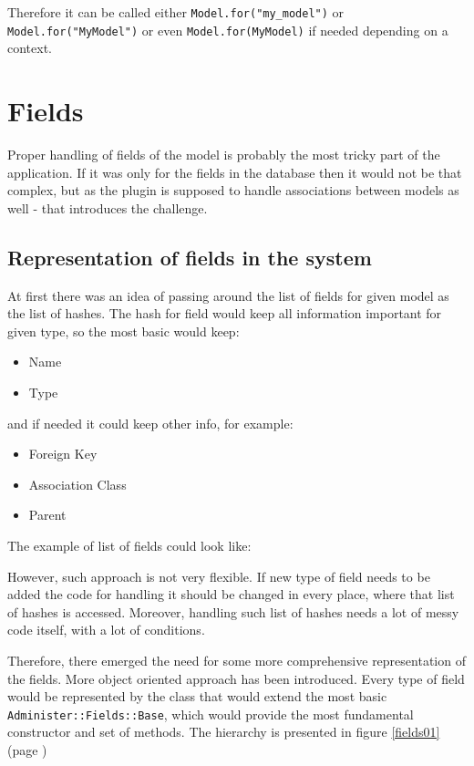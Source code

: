       Therefore it can be called either \texttt{Model.for("my\_model")} or \texttt{Model.for("MyModel")} or even \texttt{Model.for(MyModel)} if needed depending on a context.
      
  \section{Fields}
    Proper handling of fields of the model is probably the most tricky part of the application. If it was only
    for the fields in the database then it would not be that complex, but as the plugin is supposed to handle associations
    between models as well - that introduces the challenge.
    
    \subsection{Representation of fields in the system}
      At first there was an idea of passing around the list of fields for given model as the list of hashes.
      The hash for field would keep all information important for given type, so the most basic would keep:
        \begin{itemize}
          \item Name
          \item Type
        \end{itemize}
      and if needed it could keep other info, for example:
       \begin{itemize}
         \item Foreign Key
         \item Association Class
         \item Parent
        \end{itemize}
      
      The example of list of fields could look like:
      
      
      However, such approach is not very flexible. If new type of field needs to be added the code for handling it
      should be changed in every place, where that list of hashes is accessed. Moreover, handling such list of hashes
      needs a lot of messy code itself, with a lot of conditions.
      
      Therefore, there emerged the need for some more comprehensive representation of the fields. More object oriented
      approach has been introduced. Every type of field would be represented by the class that would extend the most basic
      \texttt{Administer::Fields::Base}, which would provide the most fundamental constructor and set of methods. The
      hierarchy is presented in figure \ref{fields01} (page \pageref{fields01})
         
